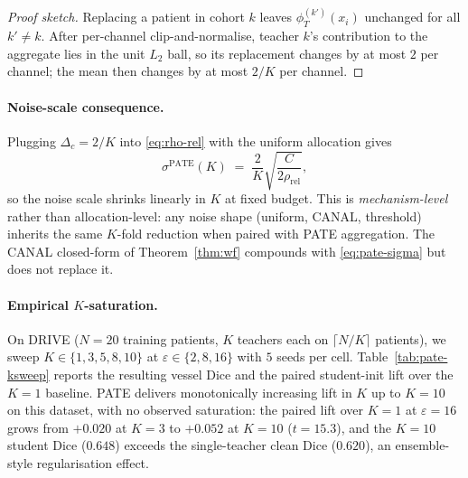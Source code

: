 \begin{proof}[Proof sketch]
Replacing a patient in cohort $k$ leaves $\phi_T^{(k')}(x_i)$ unchanged
for all $k' \ne k$. After per-channel clip-and-normalise, teacher
$k$'s contribution to the aggregate lies in the unit $L_2$ ball, so its
replacement changes by at most $2$ per channel; the mean then changes
by at most $2/K$ per channel.
\end{proof}

\paragraph{Noise-scale consequence.}
Plugging $\Delta_c = 2/K$ into \eqref{eq:rho-rel} with the uniform
allocation gives
\begin{equation}
\sigma^{\mathrm{PATE}}(K)
 \;=\; \frac{2}{K}\sqrt{\frac{C}{2\rho_{\mathrm{rel}}}},
\label{eq:pate-sigma}
\end{equation}
so the noise scale shrinks linearly in $K$ at fixed budget. This is
\emph{mechanism-level} rather than allocation-level: any noise shape
(uniform, CANAL, threshold) inherits the same $K$-fold reduction when
paired with PATE aggregation. The CANAL closed-form of
Theorem~\ref{thm:wf} compounds with \eqref{eq:pate-sigma} but does not
replace it.

\paragraph{Empirical $K$-saturation.}
On DRIVE ($N\!=\!20$ training patients, $K$ teachers each on $\lceil
N/K \rceil$ patients), we sweep $K \in \{1, 3, 5, 8, 10\}$ at
$\varepsilon \in \{2, 8, 16\}$ with $5$ seeds per cell.
Table~\ref{tab:pate-ksweep} reports the resulting vessel Dice and the
paired student-init lift over the $K\!=\!1$ baseline. PATE delivers
monotonically increasing lift in $K$ up to $K\!=\!10$ on this dataset,
with no observed saturation: the paired lift over $K\!=\!1$ at
$\varepsilon\!=\!16$ grows from $+0.020$ at $K\!=\!3$ to $+0.052$ at
$K\!=\!10$ ($t = 15.3$), and the $K\!=\!10$ student Dice
($0.648$) exceeds the single-teacher clean Dice ($0.620$), an
ensemble-style regularisation effect.

